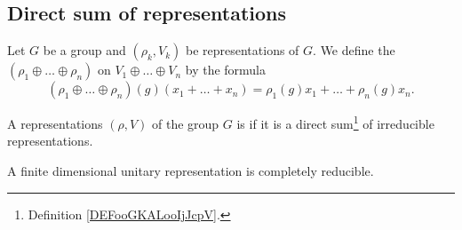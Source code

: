\subsection{Direct sum of representations}

\begin{definition}      \label{DEFooGKALooIjJcpV}
    Let \( G\) be a group and \( (\rho_k, V_k)\) be representations of \( G\). We define the  \( (\rho_1\oplus\ldots \oplus \rho_n)\) on \( V_1\oplus\ldots \oplus V_n\) by the formula
    \begin{equation}
        (\rho_1\oplus\ldots \oplus\rho_n)(g)(x_1+\ldots +x_n)=\rho_1(g)x_1+\ldots +\rho_n(g)x_n.
    \end{equation}
\end{definition}

\begin{definition}
    A representations \( (\rho, V)\) of the group \( G\) is  if it is a direct sum\footnote{Definition \ref{DEFooGKALooIjJcpV}.} of irreducible representations.
\end{definition}

\begin{lemma}
    A finite dimensional unitary representation is completely reducible.
\end{lemma}

